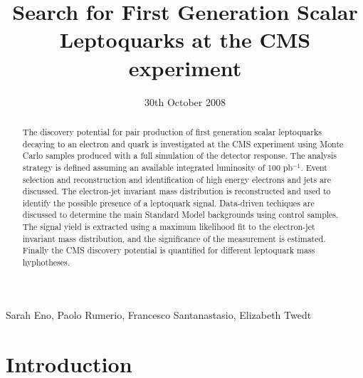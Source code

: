 
%

\begin{titlepage}

   \date{30th October 2008}


  \title{Search for First Generation Scalar Leptoquarks at the CMS experiment}

  \begin{Authlist}
   Sarah Eno, Paolo Rumerio, Francesco Santanastasio, Elizabeth Twedt
  \end{Authlist}


  \begin{abstract}
    The discovery potential for pair production of first generation scalar leptoquarks 
    decaying to an electron and quark is investigated 
    at the CMS experiment using Monte Carlo samples produced with a full simulation of the detector response.  
    The analysis strategy is defined assuming an available integrated luminosity of 100 pb$^{-1}$.
    Event selection and reconstruction and identification of high energy electrons and jets are discussed.
    The electron-jet invariant mass distribution is reconstructed
    and used to identify the possible presence of a leptoquark signal.
    Data-driven techiques are discussed to determine the main Standard Model backgrounds using 
    control samples. The signal yield is extracted using a maximum likelihood fit to the 
    electron-jet invariant mass distribution, and the significance of the measurement is estimated.
    Finally the CMS discovery potential is quantified for different leptoquark mass hyphotheses.

  \end{abstract} 

\end{titlepage}

\setcounter{page}{2}%

\section{Introduction}

